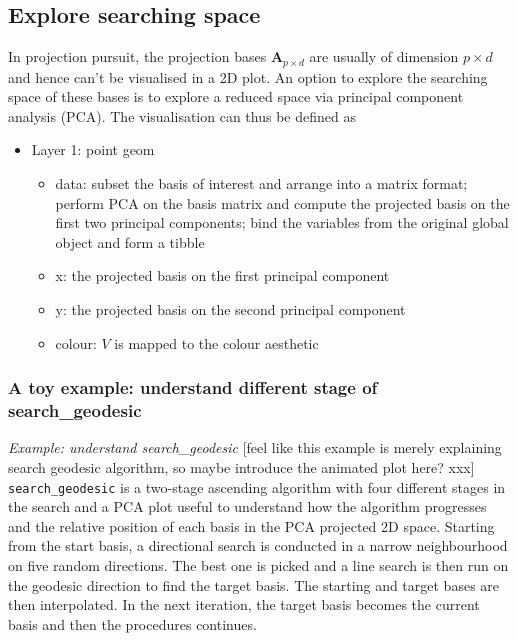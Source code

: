 \documentclass[12pt]{article}
\providecommand{\tightlist}{%
  \setlength{\itemsep}{0pt}\setlength{\parskip}{0pt}}
\begin{document}
\newpage

\hypertarget{animated}{%
\subsection{Explore searching space}\label{animated}}

In projection pursuit, the projection bases \(\mathbf{A}_{p \times d}\)
are usually of dimension \(p \times d\) and hence can't be visualised in
a 2D plot. An option to explore the searching space of these bases is to
explore a reduced space via principal component analysis (PCA). The
visualisation can thus be defined as

\begin{itemize}
\tightlist
\item
  Layer 1: point geom

  \begin{itemize}
  \tightlist
  \item
    data: subset the basis of interest and arrange into a matrix format;
    perform PCA on the basis matrix and compute the projected basis on
    the first two principal components; bind the variables from the
    original global object and form a tibble
  \item
    x: the projected basis on the first principal component
  \item
    y: the projected basis on the second principal component
  \item
    colour: \(V\) is mapped to the colour aesthetic
  \end{itemize}
\end{itemize}

\hypertarget{a-toy-example-understand-different-stage-of-search_geodesic}{%
\subsubsection{A toy example: understand different stage of
search\_geodesic}\label{a-toy-example-understand-different-stage-of-search_geodesic}}

\emph{Example: understand search\_geodesic} {[}feel like this example is
merely explaining search geodesic algorithm, so maybe introduce the
animated plot here? xxx{]} \texttt{search\_geodesic} is a two-stage
ascending algorithm with four different stages in the search and a PCA
plot useful to understand how the algorithm progresses and the relative
position of each basis in the PCA projected 2D space. Starting from the
start basis, a directional search is conducted in a narrow neighbourhood
on five random directions. The best one is picked and a line search is
then run on the geodesic direction to find the target basis. The
starting and target bases are then interpolated. In the next iteration,
the target basis becomes the current basis and then the procedures
continues.
\end{document}
